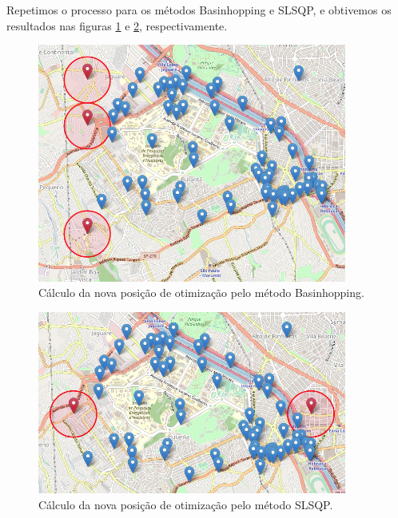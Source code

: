 \documentclass[]{politex}
\begin{document}
Repetimos o processo para os métodos Basinhopping e SLSQP, e obtivemos os
resultados nas figuras \ref{fig:basinhopping_exemplo} e
\ref{fig:slsqp_exemplo}, respectivamente.

\begin{figure}[H]
    \centering
    \includegraphics[width=4in]{imagens/basinhopping-exemplo}
    \caption{Cálculo da nova posição de otimização pelo método Basinhopping.}
    \label{fig:basinhopping_exemplo}
\end{figure}

\begin{figure}[H]
    \centering
    \includegraphics[width=4in]{imagens/slsqp-exemplo}
    \caption{Cálculo da nova posição de otimização pelo método SLSQP.}
    \label{fig:slsqp_exemplo}
\end{figure}



\end{document}
